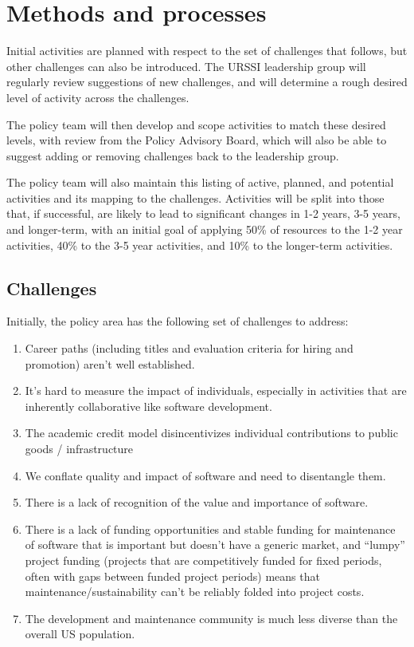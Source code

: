 \documentclass[
]{book}
\begin{document}
\hypertarget{methods-and-processes}{%
\section{Methods and processes}\label{methods-and-processes}}

Initial activities are planned with respect to the set of challenges that follows, but other
challenges can also be introduced. The URSSI leadership group will regularly review suggestions
of new challenges, and will determine a rough desired level of activity across the challenges.

The policy team will then develop and scope activities to match these desired levels, with review
from the Policy Advisory Board, which will also be able to suggest adding or removing challenges
back to the leadership group.

The policy team will also maintain this listing of active, planned, and potential activities and
its mapping to the challenges. Activities will be split into those that, if successful, are likely
to lead to significant changes in 1-2 years, 3-5 years, and longer-term, with an initial goal of
applying 50\% of resources to the 1-2 year activities, 40\% to the 3-5 year activities, and 10\% to
the longer-term activities.

\hypertarget{challenges}{%
\subsection{Challenges}\label{challenges}}

Initially, the policy area has the following set of challenges to address:

\begin{enumerate}
\def\labelenumi{\arabic{enumi}.}
\item
  Career paths (including titles and evaluation criteria for hiring and promotion) aren't well
  established.
\item
  It's hard to measure the impact of individuals, especially in activities that are inherently
  collaborative like software development.
\item
  The academic credit model disincentivizes individual contributions to public goods / infrastructure
\item
  We conflate quality and impact of software and need to disentangle them.
\item
  There is a lack of recognition of the value and importance of software.
\item
  There is a lack of funding opportunities and stable funding for maintenance of software that
  is important but doesn't have a generic market, and ``lumpy'' project funding (projects that are
  competitively funded for fixed periods, often with gaps between funded project periods) means
  that maintenance/sustainability can't be reliably folded into project costs.
\item
  The development and maintenance community is much less diverse than the overall US population.
\end{enumerate}
\end{document}

